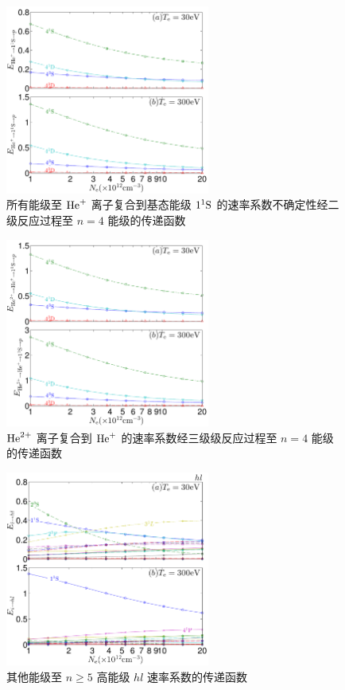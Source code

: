 \begin{figure}%
    \centering
    \includegraphics[width=0.6\textwidth]{HeII1p-error-propagation-coefficient.pdf}
    \caption{所有能级至 ${\rm He}^+$ 离子复合到基态能级 $1^1{\rm S}$ 的速率系数不确定性经二级反应过程至 $n=4$ 能级的传递函数}
    \label{fig:appendix:error-prop:6}
\end{figure}

\begin{figure}%
    \centering
    \includegraphics[width=0.6\textwidth]{HeIIIHeII1p-error-propagation-coefficient.pdf}
    \caption{${\rm He}^{2+}$ 离子复合到 ${\rm He}^+$ 的速率系数经三级级反应过程至 $n=4$ 能级的传递函数}
    \label{fig:appendix:error-prop:7}
\end{figure}

\begin{figure}%
    \centering
    \includegraphics[width=0.6\textwidth]{hl-error-propagation-coefficient.pdf}
    \caption{其他能级至 $n\ge5$ 高能级 $hl$ 速率系数的传递函数}
    \label{fig:appendix:error-prop:8}
\end{figure}
